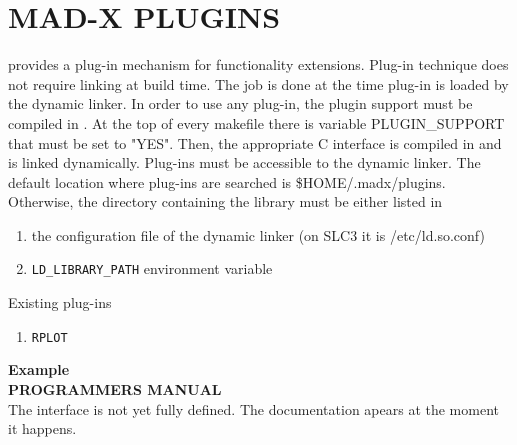 
\section{MAD-X PLUGINS}

\madx provides a plug-in mechanism for functionality extensions. Plug-in
technique does not require linking at build time. The job is done at the
time plug-in is loaded by the dynamic linker.  In order to use any
plug-in, the plugin support must be compiled in \madx. At the top of
every \madx makefile there is variable PLUGIN\_SUPPORT that must be set
to "YES".  Then, the appropriate C interface is compiled in and \madx is
linked dynamically.   Plug-ins must be accessible to the dynamic linker.
The default location where plug-ins are searched is
\$HOME/.madx/plugins. Otherwise, the directory containing the library
must be either listed in   
\begin{enumerate}
   \item  the configuration file of the dynamic linker (on SLC3 it is
     /etc/ld.so.conf)  
   \item  \texttt{LD\_LIBRARY\_PATH} environment variable 
\end{enumerate}

Existing plug-ins  
\begin{enumerate}
   \item \texttt{RPLOT}
\end{enumerate}

\textbf{ Example }\\

\textbf{ PROGRAMMERS MANUAL  }\\

The interface is not yet fully defined. The documentation apears at the moment it happens.   


